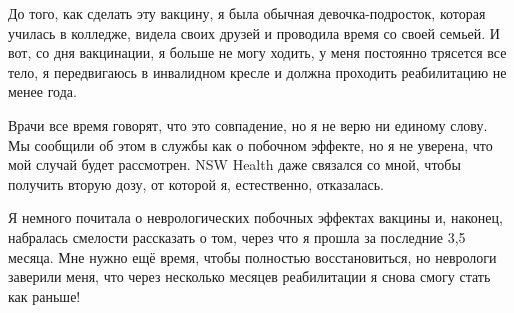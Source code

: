 {До того, как сделать эту вакцину, я была обычная девочка-подросток, которая
училась в колледже, видела своих друзей и проводила время со своей семьей. И
вот, со дня вакцинации, я больше не могу ходить, у меня постоянно трясется все
тело, я передвигаюсь в инвалидном кресле и должна проходить реабилитацию не
менее года.

Врачи все время говорят, что это совпадение, но я не верю ни единому слову. Мы
сообщили об этом в службы как о побочном эффекте, но я не уверена, что мой
случай будет рассмотрен. NSW Health даже связался со мной, чтобы получить вторую
дозу, от которой я, естественно, отказалась.

Я немного почитала о неврологических побочных эффектах вакцины и, наконец,
набралась смелости рассказать о том, через что я прошла за последние 3,5
месяца. Мне нужно ещё время, чтобы полностью восстановиться, но неврологи
заверили меня, что через несколько месяцев реабилитации я снова смогу стать как
раньше!

}
